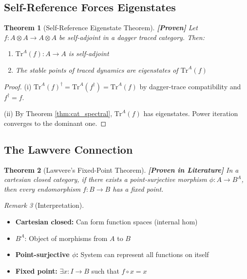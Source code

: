 \documentclass[11pt]{article}
\newtheorem{theorem}{Theorem}[section]
\theoremstyle{definition}
\theoremstyle{remark}
\newtheorem{remark}[theorem]{Remark}
\begin{document}
\subsection{Self-Reference Forces Eigenstates}

\begin{theorem}[Self-Reference Eigenstate Theorem]\label{thm:self_ref_eigen}
\textbf{[Proven]} Let $f : A \otimes A \to A \otimes A$ be self-adjoint in a dagger traced category. Then:
\begin{enumerate}[label=(\roman*)]
    \item $\text{Tr}^A(f) : A \to A$ is self-adjoint
    \item The stable points of traced dynamics are eigenstates of $\text{Tr}^A(f)$
\end{enumerate}
\end{theorem}

\begin{proof}
(i) $\text{Tr}^A(f)^\dagger = \text{Tr}^A(f^\dagger) = \text{Tr}^A(f)$ by dagger-trace compatibility and $f^\dagger = f$.

(ii) By Theorem \ref{thm:cat_spectral}, $\text{Tr}^A(f)$ has eigenstates. Power iteration converges to the dominant one.
\end{proof}

\subsection{The Lawvere Connection}

\begin{theorem}[Lawvere's Fixed-Point Theorem]
\textbf{[Proven in Literature]} In a cartesian closed category, if there exists a point-surjective morphism $\phi : A \to B^A$, then every endomorphism $f : B \to B$ has a fixed point.
\end{theorem}

\begin{remark}[Interpretation]
\begin{itemize}
    \item \textbf{Cartesian closed:} Can form function spaces (internal hom)
    \item $B^A$: Object of morphisms from $A$ to $B$
    \item \textbf{Point-surjective $\phi$:} System can represent all functions on itself
    \item \textbf{Fixed point:} $\exists x : I \to B$ such that $f \circ x = x$
\end{itemize}
\end{remark}
\end{document}
